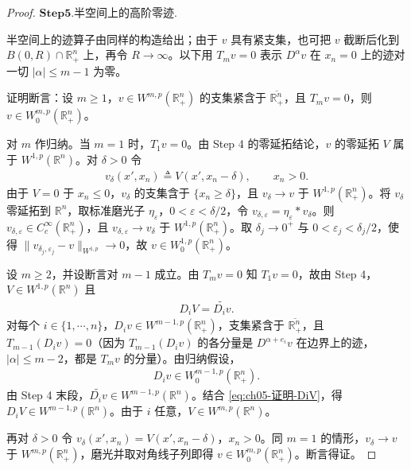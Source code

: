\documentclass[../../main.tex]{subfiles}%
\begin{document}
\begin{proof}
\noindent$\mathbf{Step}\mathbf{5}.${\heiti 半空间上的高阶零迹.}

半空间上的迹算子由同样的构造给出；由于 $v$ 具有紧支集，也可把 $v$ 截断后化到 $B(0,R)\cap\mathbb{R}^{n}_{+}$ 上，再令 $R\to\infty$。以下用 $T_{m}v=0$ 表示 $D^{\alpha}v$ 在 $x_{n}=0$ 上的迹对一切 $|\alpha|\leqslant m-1$ 为零。

证明断言：设 $m\geqslant1$，$v\in W^{m,p}(\mathbb{R}^{n}_{+})$ 的支集紧含于 $\overline{\mathbb{R}^{n}_{+}}$，且 $T_{m}v=0$，则 $v\in W^{m,p}_{0}(\mathbb{R}^{n}_{+})$。

对 $m$ 作归纳。当 $m=1$ 时，$T_{1}v=0$。由 Step 4 的零延拓结论，$v$ 的零延拓 $V$ 属于 $W^{1,p}(\mathbb{R}^{n})$。对 $\delta>0$ 令
\begin{align*}
v_{\delta}(x',x_{n})\triangleq V(x',x_{n}-\delta),
\qquad x_{n}>0.
\end{align*}
由于 $V=0$ 于 $x_{n}\leqslant0$，$v_{\delta}$ 的支集含于 $\{x_{n}\geqslant\delta\}$，且 $v_{\delta}\to v$ 于 $W^{1,p}(\mathbb{R}^{n}_{+})$。将 $v_{\delta}$ 零延拓到 $\mathbb{R}^{n}$，取标准磨光子 $\eta_{\varepsilon}$，$0<\varepsilon<\delta/2$，令 $v_{\delta,\varepsilon}=\eta_{\varepsilon}*v_{\delta}$。则 $v_{\delta,\varepsilon}\in C^{\infty}_{c}(\mathbb{R}^{n}_{+})$，且 $v_{\delta,\varepsilon}\to v_{\delta}$ 于 $W^{1,p}(\mathbb{R}^{n}_{+})$。取 $\delta_{j}\to0^{+}$ 与 $0<\varepsilon_{j}<\delta_{j}/2$，使得 $\|v_{\delta_{j},\varepsilon_{j}}-v\|_{W^{1,p}}\to0$，故 $v\in W^{1,p}_{0}(\mathbb{R}^{n}_{+})$。

设 $m\geqslant2$，并设断言对 $m-1$ 成立。由 $T_{m}v=0$ 知 $T_{1}v=0$，故由 Step 4，$V\in W^{1,p}(\mathbb{R}^{n})$ 且
\begin{align}
D_{i}V=\widetilde{D_{i}v}.
\label{eq:ch05-证明-DiV}
\end{align}
对每个 $i\in\{1,\cdots,n\}$，$D_{i}v\in W^{m-1,p}(\mathbb{R}^{n}_{+})$，支集紧含于 $\overline{\mathbb{R}^{n}_{+}}$，且 $T_{m-1}(D_{i}v)=0$（因为 $T_{m-1}(D_{i}v)$ 的各分量是 $D^{\alpha+e_{i}}v$ 在边界上的迹，$|\alpha|\leqslant m-2$，都是 $T_{m}v$ 的分量）。由归纳假设，
\begin{align}
D_{i}v\in W^{m-1,p}_{0}(\mathbb{R}^{n}_{+}).
\label{eq:ch05-证明-Div零迹}
\end{align}
由 Step 4 末段，$\widetilde{D_{i}v}\in W^{m-1,p}(\mathbb{R}^{n})$。结合 \eqref{eq:ch05-证明-DiV}，得 $D_{i}V\in W^{m-1,p}(\mathbb{R}^{n})$。由于 $i$ 任意，$V\in W^{m,p}(\mathbb{R}^{n})$。

再对 $\delta>0$ 令 $v_{\delta}(x',x_{n})=V(x',x_{n}-\delta)$，$x_{n}>0$。同 $m=1$ 的情形，$v_{\delta}\to v$ 于 $W^{m,p}(\mathbb{R}^{n}_{+})$，磨光并取对角线子列即得 $v\in W^{m,p}_{0}(\mathbb{R}^{n}_{+})$。断言得证。


\end{proof}
\end{document}
